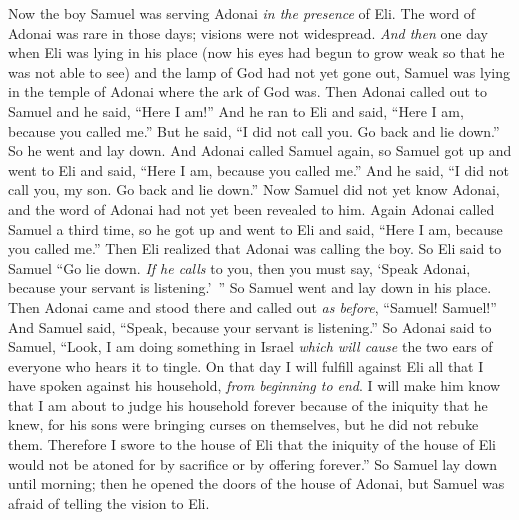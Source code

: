 \begin{biblechapter} %
 Now the boy Samuel was serving Adonai \textit{in the presence} of Eli. The word of Adonai was rare in those days; visions were not widespread.
\verse \textit{And then} one day when Eli was lying in his place (now his eyes had begun to grow weak so that he was not able to see)
\verse and the lamp of God had not yet gone out, Samuel was lying in the temple of Adonai where the ark of God was.
\verse Then Adonai called out to Samuel and he said, “Here I am!”
\verse And he ran to Eli and said, “Here I am, because you called me.” But he said, “I did not call you. Go back and lie down.” So he went and lay down.
\verse And Adonai called Samuel again, so Samuel got up and went to Eli and said, “Here I am, because you called me.” And he said, “I did not call you, my son. Go back and lie down.”
\verse Now Samuel did not yet know Adonai, and the word of Adonai had not yet been revealed to him.
\verse Again Adonai called Samuel a third time, so he got up and went to Eli and said, “Here I am, because you called me.” Then Eli realized that Adonai was calling the boy.
\verse So Eli said to Samuel “Go lie down. \textit{If he calls} to you, then you must say, ‘Speak Adonai, because your servant is listening.’ ” So Samuel went and lay down in his place.
\verse Then Adonai came and stood there and called out \textit{as before}, “Samuel! Samuel!” And Samuel said, “Speak, because your servant is listening.”
\verse So Adonai said to Samuel, “Look, I am doing something in Israel \textit{which will cause} the two ears of everyone who hears it to tingle.
\verse On that day I will fulfill against Eli all that I have spoken against his household, \textit{from beginning to end}.
\verse I will make him know that I am about to judge his household forever because of the iniquity that he knew, for his sons were bringing curses on themselves, but he did not rebuke them.
\verse Therefore I swore to the house of Eli that the iniquity of the house of Eli would not be atoned for by sacrifice or by offering forever.”
\verse So Samuel lay down until morning; then he opened the doors of the house of Adonai, but Samuel was afraid of telling the vision to Eli.

\end{biblechapter}
